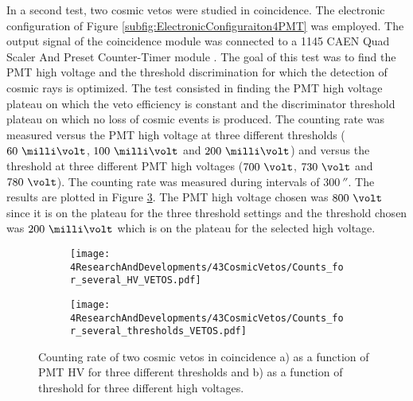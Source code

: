 In a second test, two cosmic vetos were studied in coincidence. The electronic configuration of Figure \ref{subfig:ElectronicConfiguraiton4PMT} was employed. The output signal of the coincidence module was connected to a 1145 CAEN Quad Scaler And Preset Counter-Timer module \cite{ScalerDataSheet}. The goal of this test was to find the PMT high voltage and the threshold discrimination for which the detection of cosmic rays is optimized. The test consisted in finding the PMT high voltage plateau on which the veto efficiency is constant and the discriminator threshold plateau on which no loss of cosmic events is produced. The counting rate was measured versus the PMT high voltage at three different thresholds ($60~\milli\volt$, $100~\milli\volt$ and $200~\milli\volt$) and versus the threshold at three different PMT high voltages ($700~\volt$, $730~\volt$ and $780~\volt$). The counting rate was measured during intervals of $300~\second$. The results are plotted in Figure \ref{fig:HVandThresholdsPLateaus}. The PMT high voltage chosen was $800~\volt$ since it is on the plateau for the three threshold settings and the threshold chosen was $200~\milli\volt$ which is on the plateau for the selected high voltage. 

\begin{figure}
\centering
    \begin{subfigure}[b]{1\textwidth}
    \centering
    \texttt{[image: 4ResearchAndDevelopments/43CosmicVetos/Counts\_for\_several\_HV\_VETOS.pdf]}  
    \caption{\label{subfig:HVPLateauVetos}}
    \end{subfigure}
    \hfill
    \begin{subfigure}[b]{1\textwidth}
    \centering
    \texttt{[image: 4ResearchAndDevelopments/43CosmicVetos/Counts\_for\_several\_thresholds\_VETOS.pdf]}  
    \caption{\label{subfig:ThresholdsPlateau}}
    \end{subfigure}
 \caption{Counting rate of two cosmic vetos in coincidence a) as a function of PMT HV for three different thresholds and b) as a function of threshold for three different high voltages.}
 \label{fig:HVandThresholdsPLateaus}
\end{figure}

